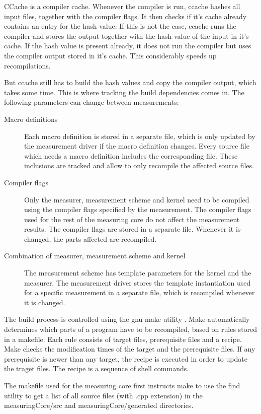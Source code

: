 \documentclass[a4paper,12pt]{article}
\newcommand{\file}[1]{}
\begin{document}
CCache is a compiler cache. Whenever the compiler is run, ccache hashes all input files, together with the compiler flags. It then checks if it's cache already contains an entry for the hash value. If this is not the case, ccache runs the compiler and stores the output together with the hash value of the input in it's cache. If the hash value is present already, it does not run the compiler but uses the compiler output stored in it's cache. This considerably speeds up recompilations.

But ccache still has to build the hash values and copy the compiler output, which takes some time. This is where tracking the build dependencies comes in. The following parameters can change between measurements:
\begin{description}
\item[Macro definitions]
Each macro definition is stored in a separate file, which is only updated by the measurement driver if the macro definition changes. Every source file which needs a macro definition includes the corresponding file. These inclusions are tracked and allow to only recompile the affected source files.
\item[Compiler flags] 
Only the measurer, measurement scheme and kernel need to be compiled using the compiler flags specified by the measurement. The compiler flags used for the rest of the measuring core do not affect the measurement results. The compiler flags are stored in a separate file. Whenever it is changed, the parts affected are recompiled.
\item[Combination of measurer, measurement scheme and kernel]
The measurement scheme has template parameters for the kernel and the measurer. The measurement driver stores the template instantiation used for a specific measurement in a separate file, which is recompiled whenever it is changed.
\end{description}

\file{measuringCore/makefile}
The build process is controlled using the gnu make utility \cite{make}. Make automatically determines which parts of a program have to be recompiled, based on rules stored in a makefile. Each rule consists of target files, prerequisite files and a recipe. Make checks the modification times of the target and the prerequisite files. If any prerequisite is newer than any target, the recipe is executed in order to update the traget files. The recipe is a sequence of shell commands.

The makefile used for the measuring core first instructs make to use the find utility to get a list of all source files (with .cpp extension) in the measuringCore/src and measuringCore/generated directories.
\end{document}
